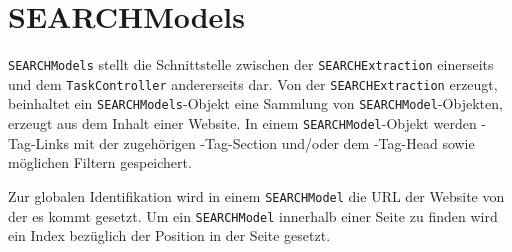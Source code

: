 
\section{SEARCHModels}
\lstinline|SEARCHModels| stellt die Schnittstelle zwischen der \lstinline|SEARCHExtraction| einerseits und dem \lstinline|TaskController| andererseits dar. Von der \lstinline|SEARCHExtraction| erzeugt, beinhaltet ein \lstinline|SEARCHModels|-Objekt eine Sammlung von \lstinline|SEARCHModel|-Objekten, erzeugt aus dem Inhalt einer Website. In einem \lstinline|SEARCHModel|-Objekt werden \SEARCH-Tag-Links mit der zugehörigen \SEARCH-Tag-Section und/oder dem \SEARCH-Tag-Head sowie möglichen Filtern gespeichert.

Zur globalen Identifikation wird in einem \lstinline|SEARCHModel| die URL der Website von der es kommt gesetzt. Um ein \lstinline|SEARCHModel| innerhalb einer Seite zu finden wird ein Index bezüglich der Position in der Seite gesetzt.